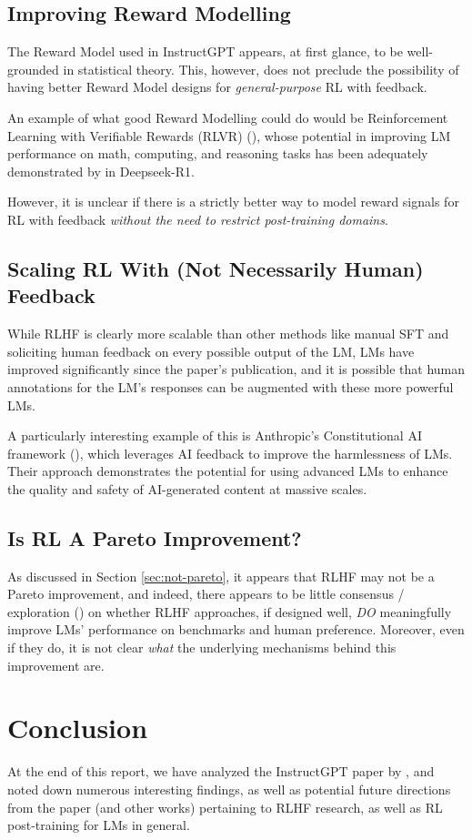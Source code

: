 \documentclass{article} %
\begin{document}
\subsection{Improving Reward Modelling}
The Reward Model used in InstructGPT appears, at first glance,
to be well-grounded in statistical theory. This, however, does not preclude
the possibility of having better Reward Model designs for \textit{general-purpose} RL with
feedback.

An example of what good Reward Modelling could do would be Reinforcement Learning with
Verifiable Rewards (RLVR) (\cite{Lambert-et-al-2024}), whose potential
in improving LM performance on math, computing, and reasoning tasks
has been adequately demonstrated by \cite{Deepseek-2025} in Deepseek-R1.

However, it is unclear if there is a strictly better way to
model reward signals for RL with feedback 
\textit{without the need to restrict post-training domains}.

\subsection{Scaling RL With (Not Necessarily Human) Feedback}
While RLHF is clearly more scalable than other methods like 
manual SFT and soliciting human feedback on every possible output of the LM,
LMs have improved significantly since the paper's publication, and
it is possible that human annotations for the LM's responses
can be augmented with these more powerful LMs.

A particularly interesting example of this is Anthropic's Constitutional AI framework
(\cite{Bai-et-al-2022}), which leverages AI feedback to improve the harmlessness of LMs. 
Their approach demonstrates the potential for using advanced LMs to enhance the quality and safety of AI-generated content
at massive scales.

\subsection{Is RL A Pareto Improvement?}
As discussed in Section \ref{sec:not-pareto}, it appears that 
RLHF may not be a Pareto improvement, and indeed, 
there appears to be little consensus / exploration (\cite{Lin-et-al-2024, Berg-et-al-2024}) on whether
RLHF approaches, if designed well, \textit{DO} meaningfully improve LMs' performance on benchmarks
and human preference. Moreover, even if they do, it is not clear 
\textit{what} the underlying mechanisms behind this improvement are.

\section{Conclusion}
At the end of this report, we have analyzed the InstructGPT paper by \cite{InstructGPT-2022},
and noted down numerous interesting findings, as well as potential future directions
from the paper (and other works) pertaining to RLHF research, as well as RL post-training for LMs in general.




\appendix
\end{document}
